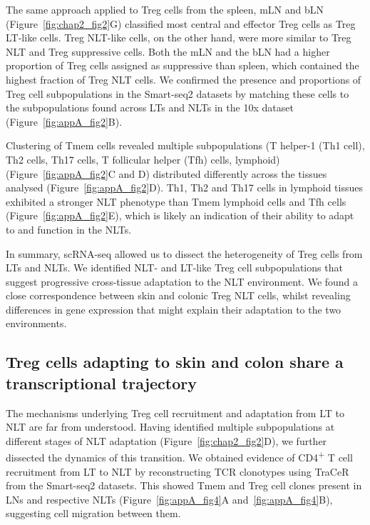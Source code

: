 The same approach applied to Treg cells from the spleen, mLN and bLN (Figure~\ref{fig:chap2_fig2}G) classified most central and effector Treg cells as Treg LT-like cells. Treg NLT-like cells, on the other hand, were more similar to Treg NLT and Treg suppressive cells. Both the mLN and the bLN had a higher proportion of Treg cells assigned as suppressive than spleen, which contained the highest fraction of Treg NLT cells. We confirmed the presence and proportions of Treg cell subpopulations in the Smart-seq2 datasets by matching these cells to the subpopulations found across LTs and NLTs in the 10x dataset (Figure~\ref{fig:appA_fig2}B).

Clustering of Tmem cells revealed multiple subpopulations (T helper-1 (Th1 cell), Th2 cells, Th17 cells, T follicular helper (Tfh) cells, lymphoid) (Figure~\ref{fig:appA_fig2}C and D) distributed differently across the tissues analysed (Figure~\ref{fig:appA_fig2}D). Th1, Th2 and Th17 cells in lymphoid tissues exhibited a stronger NLT phenotype than Tmem lymphoid cells and Tfh cells (Figure~\ref{fig:appA_fig2}E), which is likely an indication of their ability to adapt to and function in the NLTs.

In summary, scRNA-seq allowed us to dissect the heterogeneity of Treg cells from LTs and NLTs. We identified NLT- and LT-like Treg cell subpopulations that suggest progressive cross-tissue adaptation to the NLT environment. We found a close correspondence between skin and colonic Treg NLT cells, whilst revealing differences in gene expression that might explain their adaptation to the two environments.



\subsection{Treg cells adapting to skin and colon share a transcriptional trajectory}
\label{section2.2.3}
The mechanisms underlying Treg cell recruitment and adaptation from LT to NLT are far from understood. Having identified multiple subpopulations at different stages of NLT adaptation (Figure~\ref{fig:chap2_fig2}D), we further dissected the dynamics of this transition. We obtained evidence of CD4\textsuperscript{+} T cell recruitment from LT to NLT by reconstructing TCR clonotypes using TraCeR~\citep{stubbington_t_2016} from the Smart-seq2 datasets. This showed Tmem and Treg cell clones present in LNs and respective NLTs (Figure~\ref{fig:appA_fig4}A and~\ref{fig:appA_fig4}B), suggesting cell migration between them.


